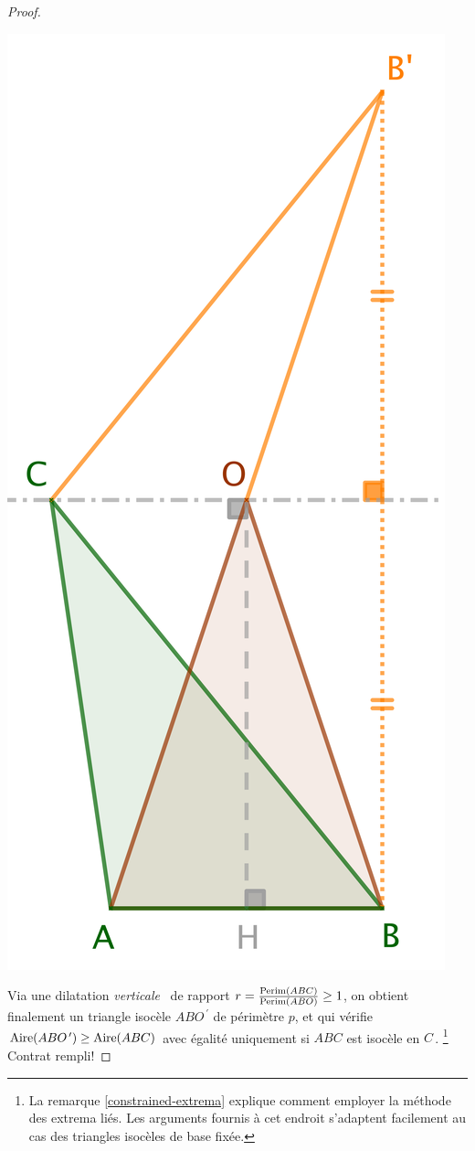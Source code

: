 \begin{proof}
	\begin{center}
		\includegraphics[scale=.4]{content/triangle-one-side-fixed/triangle-proof.png}
	\end{center}
	
	Via une dilatation \og \emph{verticale} \fg\ de rapport $r = \frac{\mathrm{Perim}(ABC)}{\mathrm{Perim}(ABO)} \geq 1$, on obtient finalement un triangle isocèle $ABO^{\,\prime}$ de périmètre $p$, et qui vérifie $\mathrm{Aire}(ABO^{\,\prime}) \geq \mathrm{Aire}(ABC)$ avec égalité uniquement si $ABC$ est isocèle en $C$\,.
	\footnote{
		La remarque \ref{constrained-extrema} explique comment employer la méthode des extrema liés. 
		Les arguments fournis à cet endroit s'adaptent facilement au cas des triangles isocèles de base fixée.
	}
	Contrat rempli!
\end{proof}
